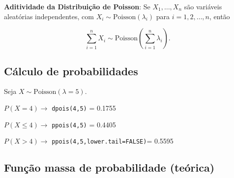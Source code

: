 \documentclass[
]{book}
\begin{document}
\textbf{Aditividade da Distribuição de Poisson}: Se \(X_1, \dots, X_n\) são variáveis aleatórias independentes, com \(X_i \sim \text{Poisson}(\lambda_i)\) para \(i = 1, 2, \dots, n\), então

\[
\sum_{i=1}^n X_i \sim \text{Poisson}\left( \sum_{i=1}^n \lambda_i \right).
\]

\subsection{Cálculo de probabilidades}\label{cuxe1lculo-de-probabilidades-3}

Seja \(X\sim\text{Poisson}(\lambda=5)\).

\(P(X =4) \to\) \texttt{dpois(4,5)} = 0.1755

\noindent \(P(X\leq 4) \to\) \texttt{ppois(4,5)} = 0.4405

\noindent \(P(X > 4)\to\) \texttt{ppois(4,5,lower.tail=FALSE)}= 0.5595

\subsection{Função massa de probabilidade (teórica)}\label{funuxe7uxe3o-massa-de-probabilidade-teuxf3rica-1}
\end{document}
